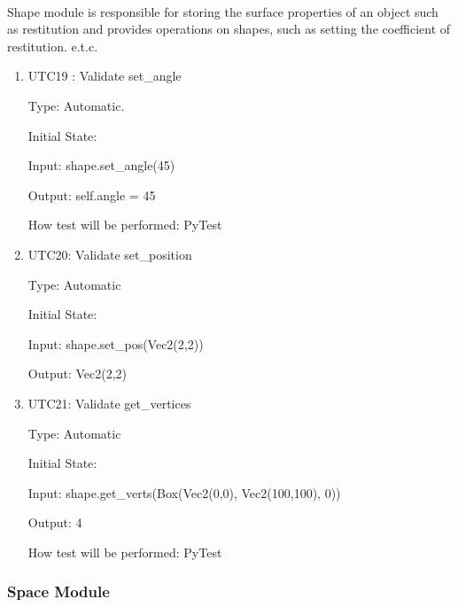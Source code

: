 \documentclass[12pt, titlepage]{article}
\begin{document}
\paragraph{}
Shape module is responsible for storing the surface properties of an object such as restitution and provides operations on shapes, such as setting the coefficient of restitution. e.t.c.
\begin{enumerate}
	
	
	\item{UTC19} {: Validate set\_angle \\}
	
	Type: Automatic.
	
	Initial State: 
	
	Input: shape.set\_angle(45)
	
	Output: self.angle = 45
	
	How test will be performed: PyTest 
	
	\item{UTC20}{: Validate set\_position\\}
	
	Type: Automatic
	
	Initial State: 
	
	Input: shape.set\_pos(Vec2(2,2))
	
	Output: Vec2(2,2)
	
	\item{UTC21}{: Validate get\_vertices\\}
	
	Type: Automatic
	
	Initial State: 
	
	Input: shape.get\_verts(Box(Vec2(0,0), Vec2(100,100), 0)) 
	
	Output: 4
	
	How test will be performed: PyTest
	

\end{enumerate}
\subsubsection{Space Module}
\end{document}
